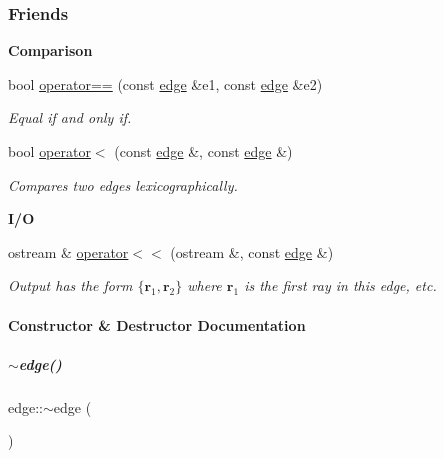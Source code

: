 \subsubsection*{Friends}
\begin{Indent}\textbf{ Comparison}\par
\begin{DoxyCompactItemize}
\item 
bool \hyperlink{group___c_l_s_solvers_a87086330455166d1fe4bb71be060fbcc}{operator==} (const \hyperlink{group___c_l_s_solvers_classedge}{edge} \&e1, const \hyperlink{group___c_l_s_solvers_classedge}{edge} \&e2)
\begin{DoxyCompactList}\small\item\em Equal if and only if. \end{DoxyCompactList}\item 
bool \hyperlink{group___c_l_s_solvers_a983f5438e6720d3bc1d7763c0c04fcae}{operator$<$} (const \hyperlink{group___c_l_s_solvers_classedge}{edge} \&, const \hyperlink{group___c_l_s_solvers_classedge}{edge} \&)
\begin{DoxyCompactList}\small\item\em Compares two edges lexicographically. \end{DoxyCompactList}\end{DoxyCompactItemize}
\end{Indent}
\begin{Indent}\textbf{ I/O}\par
\begin{DoxyCompactItemize}
\item 
\mbox{\label{group___c_l_s_solvers_aad6bb96213a9839cb6b32592a4105f53}} 
ostream \& \hyperlink{group___c_l_s_solvers_aad6bb96213a9839cb6b32592a4105f53}{operator$<$$<$} (ostream \&, const \hyperlink{group___c_l_s_solvers_classedge}{edge} \&)
\begin{DoxyCompactList}\small\item\em Output has the form $ \{ \mathbf{r}_1, \mathbf{r}_2 \} $ where $ \mathbf{r}_1 $ is the first ray in this edge, etc. \end{DoxyCompactList}\end{DoxyCompactItemize}
\end{Indent}


\paragraph{Constructor \& Destructor Documentation}
\mbox{\label{group___c_l_s_solvers_a6295b7f8e62fa95cd887fb78d64347f5}} 
\subparagraph{\texorpdfstring{$\sim$edge()}{~edge()}}
{\footnotesize\ttfamily edge\+::$\sim$edge (\begin{DoxyParamCaption}{ }\end{DoxyParamCaption})\hspace{0.3cm}{\ttfamily [inline]}}

